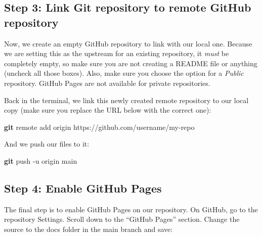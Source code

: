 \documentclass[
]{book}
\newenvironment{Shaded}{\begin{snugshade}}{\end{snugshade}}
\newcommand{\AttributeTok}[1]{\textcolor[rgb]{0.13,0.29,0.53}{#1}}
\newcommand{\FunctionTok}[1]{\textcolor[rgb]{0.13,0.29,0.53}{\textbf{#1}}}
\newcommand{\NormalTok}[1]{#1}
\begin{document}
\hypertarget{step-3-link-git-repository-to-remote-github-repository}{%
\subsection{Step 3: Link Git repository to remote GitHub repository}\label{step-3-link-git-repository-to-remote-github-repository}}

Now, we create an empty GitHub repository to link with our local one. Because we are setting this as the upstream for an existing repository, it \emph{must} be completely empty, so make sure you are not creating a README file or anything (uncheck all those boxes). Also, make sure you choose the option for a \emph{Public} repository. GitHub Pages are not available for private repositories.

Back in the terminal, we link this newly created remote repository to our local copy (make sure you replace the URL below with the correct one):

\begin{Shaded}
\begin{Highlighting}[]

\FunctionTok{git}\NormalTok{ remote add origin https://github.com/username/my{-}repo}
\end{Highlighting}
\end{Shaded}

And we push our files to it:

\begin{Shaded}
\begin{Highlighting}[]

\FunctionTok{git}\NormalTok{ push }\AttributeTok{{-}u}\NormalTok{ origin main}
\end{Highlighting}
\end{Shaded}

\hypertarget{step-4-enable-github-pages}{%
\subsection{Step 4: Enable GitHub Pages}\label{step-4-enable-github-pages}}

The final step is to enable GitHub Pages on our repository. On GitHub, go to the repository Settings. Scroll down to the ``GitHub Pages'' section. Change the source to the docs folder in the main branch and save:
\end{document}
